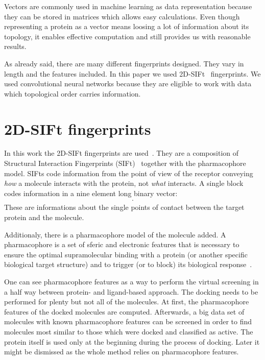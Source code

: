 \documentclass[a4paper,10pt]{report}
\begin{document}
    Vectors are commonly used in machine learning as data representation because they can be stored in matrices which allows easy calculations. Even though representing a protein as a vector means loosing a lot of information about its topology, it enables effective computation and still provides us with reasonable results. 
    
    As already said, there are many different fingerprints designed. They vary in length and the features included. In this paper we used 2D-SIFt~\cite{2DSIFT} fingerprints. We used convolutional neural networks because they are eligible to work with data which topological order carries information.
     
     
    \section{2D-SIFt fingerprints}
    In this work the 2D-SIFt fingerprints are used~\cite{2DSIFT, Mordalski2011}. They are a composition of Structural Interaction Fingerprints (SIFt)~\cite{Singh2006} together with the pharmacophore model. SIFts code information from the point of view of the receptor conveying \textit{how} a molecule interacts with the protein, not \textit{what} interacts. A single block codes information in a nine element long binary vector:
    \begin{align*}
    [\text{any contact},&\text{backbone},\text{sidechain},\text{polar},\text{hydrophobic}, \\
    &\text{H-bond acceptor},\text{H-bond donor},\text{aromatic},\text{charged}
    ].
    \end{align*}
    These are informations about the single points of contact between the target protein and the molecule.
    
    Additionaly, there is a pharmacophore model of the molecule added. A pharmacophore is a set of sferic and electronic features that is necessary to ensure the optimal supramolecular binding with a protein (or another specific biological target structure) and to trigger (or to block) its biological response~\cite{GLOSSARY}.
    
    One can see pharmacophore features as a way to perform the virtual screening in a half way between protein- and ligand-based approach. The docking needs to be performed for plenty but not all of the molecules. At first, the pharmacophore features of the docked molecules are computed. Afterwards, a big data set of molecules with known pharmacophore features can be screened in order to find molecules most similar to those which were docked and classified as active. The protein itself is used only at the beginning during the process of docking. Later it might be dismissed as the whole method relies on pharmacophore features.
    
\end{document}
